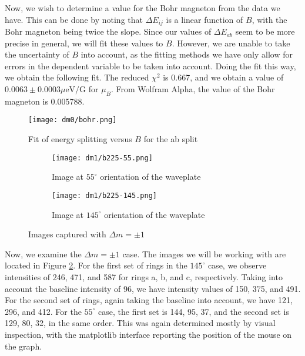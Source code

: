 \documentclass{amsart}
\begin{document}
Now, we wish to determine a value for the Bohr magneton from the data we have. This can be done by noting that $\Delta E_{ij}$ is a linear function of $B$, with the Bohr magneton being twice the slope. Since our values of $\Delta E_{ab}$ seem to be more precise in general, we will fit these values to $B$. However, we are unable to take the uncertainty of $B$ into account, as the fitting methods we have only allow for errors in the dependent variable to be taken into account. Doing the fit this way, we obtain the following fit. The reduced $\chi^2$ is 0.667, and we obtain a value of $0.0063\pm0.0003 \mu\text{eV}/\text{G}$ for $\mu_B$. From Wolfram Alpha, the value of the Bohr magneton is 0.005788.

\begin{figure}
\centering
\texttt{[image: dm0/bohr.png]}
\caption{Fit of energy splitting versus $B$ for the ab split}
\label{bohr}
\end{figure}

\begin{figure}
\centering
\begin{subfigure}[b]{0.45\textwidth}
\centering
\texttt{[image: dm1/b225-55.png]}
\caption{Image at $55^\circ$ orientation of the waveplate}
\end{subfigure}
\quad
\begin{subfigure}[b]{0.45\textwidth}
\centering
\texttt{[image: dm1/b225-145.png]}
\caption{Image at $145^\circ$ orientation of the waveplate}
\end{subfigure}
\caption{Images captured with $\Delta m=\pm1$}
\label{rings1}
\end{figure}

Now, we examine the $\Delta m=\pm1$ case. The images we will be working with are located in Figure \ref{rings1}. For the first set of rings in the $145^\circ$ case, we observe intensities of 246, 471, and 587 for rings a, b, and c, respectively. Taking into account the baseline intensity of 96, we have intensity values of 150, 375, and 491. For the second set of rings, again taking the baseline into account, we have 121, 296, and 412. For the $55^\circ$ case, the first set is 144, 95, 37, and the second set is 129, 80, 32, in the same order. This was again determined mostly by visual inspection, with the matplotlib interface reporting the position of the mouse on the graph. 
\end{document}
